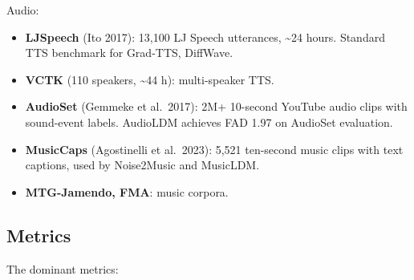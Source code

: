 Audio:

\begin{itemize}
\tightlist
\item
  \textbf{LJSpeech} (Ito 2017): 13,100 LJ Speech utterances, \textasciitilde24 hours. Standard TTS benchmark for Grad-TTS, DiffWave.
\item
  \textbf{VCTK} (110 speakers, \textasciitilde44 h): multi-speaker TTS.
\item
  \textbf{AudioSet} (Gemmeke et al.~2017): 2M+ 10-second YouTube audio clips with sound-event labels. AudioLDM achieves FAD 1.97 on AudioSet evaluation.
\item
  \textbf{MusicCaps} (Agostinelli et al.~2023): 5,521 ten-second music clips with text captions, used by Noise2Music and MusicLDM.
\item
  \textbf{MTG-Jamendo, FMA}: music corpora.
\end{itemize}

\subsection{Metrics}\label{metrics}

The dominant metrics:

